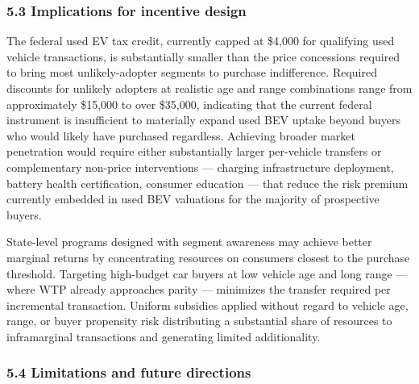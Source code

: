 \documentclass[
  letterpaper,
  DIV=11,
  numbers=noendperiod]{scrartcl}
\begin{document}
\subsubsection{5.3 Implications for incentive
design}\label{implications-for-incentive-design}

The federal used EV tax credit, currently capped at \$4,000 for
qualifying used vehicle transactions, is substantially smaller than the
price concessions required to bring most unlikely-adopter segments to
purchase indifference. Required discounts for unlikely adopters at
realistic age and range combinations range from approximately \$15,000
to over \$35,000, indicating that the current federal instrument is
insufficient to materially expand used BEV uptake beyond buyers who
would likely have purchased regardless. Achieving broader market
penetration would require either substantially larger per-vehicle
transfers or complementary non-price interventions --- charging
infrastructure deployment, battery health certification, consumer
education --- that reduce the risk premium currently embedded in used
BEV valuations for the majority of prospective buyers.

State-level programs designed with segment awareness may achieve better
marginal returns by concentrating resources on consumers closest to the
purchase threshold. Targeting high-budget car buyers at low vehicle age
and long range --- where WTP already approaches parity --- minimizes the
transfer required per incremental transaction. Uniform subsidies applied
without regard to vehicle age, range, or buyer propensity risk
distributing a substantial share of resources to inframarginal
transactions and generating limited additionality.

\subsubsection{5.4 Limitations and future
directions}\label{limitations-and-future-directions}
\end{document}
